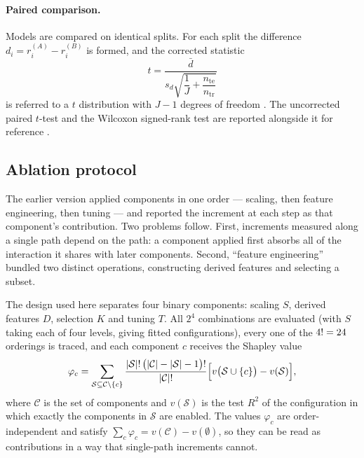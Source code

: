 \documentclass[pdflatex,sn-mathphys-num]{sn-jnl}
\begin{document}
\paragraph{Paired comparison.} Models are compared on identical splits. For each split the difference $d_i = r_i^{(A)} - r_i^{(B)}$ is formed, and the corrected statistic
\begin{equation}
t = \frac{\bar{d}}{s_d \sqrt{\dfrac{1}{J} + \dfrac{n_{\text{te}}}{n_{\text{tr}}}}}
\label{eq:nb-t}
\end{equation}
is referred to a $t$ distribution with $J-1$ degrees of freedom \cite{nadeau2003}. The uncorrected paired $t$-test and the Wilcoxon signed-rank test are reported alongside it for reference \cite{dietterich1998}.

\subsection{Ablation protocol}\label{sec:ablation-protocol}
The earlier version applied components in one order --- scaling, then feature engineering, then tuning --- and reported the increment at each step as that component's contribution. Two problems follow. First, increments measured along a single path depend on the path: a component applied first absorbs all of the interaction it shares with later components. Second, ``feature engineering'' bundled two distinct operations, constructing derived features and selecting a subset.

The design used here separates four binary components: scaling $S$, derived features $D$, selection $K$ and tuning $T$. All $2^4$ combinations are evaluated (with $S$ taking each of four levels, giving \AblNcells{} fitted configurations), every one of the $4! = 24$ orderings is traced, and each component $c$ receives the Shapley value \cite{shapley1953}
\begin{equation}
\varphi_c = \sum_{\mathcal{S} \subseteq \mathcal{C} \setminus \{c\}}
\frac{|\mathcal{S}|!\,\bigl(|\mathcal{C}| - |\mathcal{S}| - 1\bigr)!}{|\mathcal{C}|!}
\Bigl[ v\bigl(\mathcal{S} \cup \{c\}\bigr) - v(\mathcal{S}) \Bigr],
\label{eq:shapley}
\end{equation}
where $\mathcal{C}$ is the set of components and $v(\mathcal{S})$ is the test $R^2$ of the configuration in which exactly the components in $\mathcal{S}$ are enabled. The values $\varphi_c$ are order-independent and satisfy $\sum_c \varphi_c = v(\mathcal{C}) - v(\emptyset)$, so they can be read as contributions in a way that single-path increments cannot.
\end{document}
